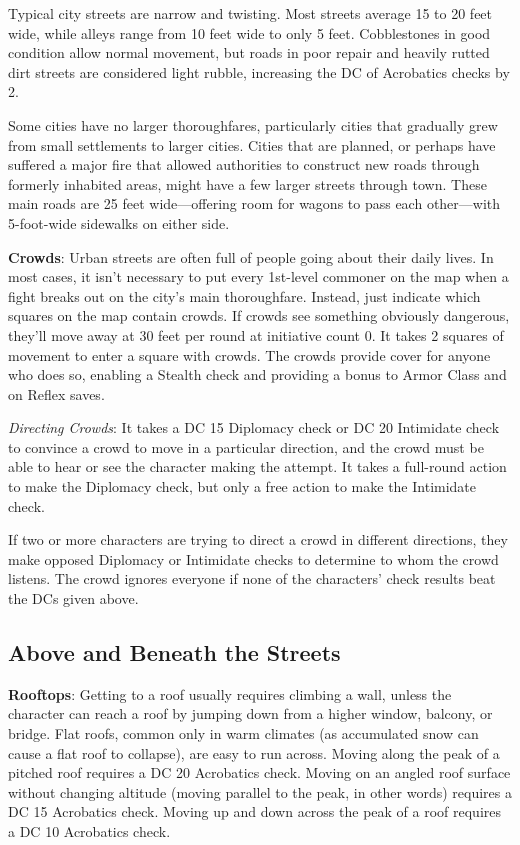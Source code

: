 				
Typical city streets are narrow and twisting. Most streets average 15 to 20 feet wide, while alleys range from 10 feet wide to only 5 feet. Cobblestones in good condition allow normal movement, but roads in poor repair and heavily rutted dirt streets are considered light rubble, increasing the DC of Acrobatics checks by 2.
				
Some cities have no larger thoroughfares, particularly cities that gradually grew from small settlements to larger cities. Cities that are planned, or perhaps have suffered a major fire that allowed authorities to construct new roads through formerly inhabited areas, might have a few larger streets through town. These main roads are 25 feet wide---offering room for wagons to pass each other---with 5-foot-wide sidewalks on either side.
				
\textbf{Crowds}: Urban streets are often full of people going about their daily lives. In most cases, it isn't necessary to put every 1st-level commoner on the map when a fight breaks out on the city's main thoroughfare. Instead, just indicate which squares on the map contain crowds. If crowds see something obviously dangerous, they'll move away at 30 feet per round at initiative count 0. It takes 2 squares of movement to enter a square with crowds. The crowds provide cover for anyone who does so, enabling a Stealth check and providing a bonus to Armor Class and on Reflex saves.
				
\textit{Directing Crowds}: It takes a DC 15 Diplomacy check or DC 20 Intimidate check to convince a crowd to move in a particular direction, and the crowd must be able to hear or see the character making the attempt. It takes a full-round action to make the Diplomacy check, but only a free action to make the Intimidate check.
				
If two or more characters are trying to direct a crowd in different directions, they make opposed Diplomacy or Intimidate checks to determine to whom the crowd listens. The crowd ignores everyone if none of the characters' check results beat the DCs given above.
				
\subsection{Above and Beneath the Streets}

				
\textbf{Rooftops}: Getting to a roof usually requires climbing a wall, unless the character can reach a roof by jumping down from a higher window, balcony, or bridge. Flat roofs, common only in warm climates (as accumulated snow can cause a flat roof to collapse), are easy to run across. Moving along the peak of a pitched roof requires a DC 20 Acrobatics check. Moving on an angled roof surface without changing altitude (moving parallel to the peak, in other words) requires a DC 15 Acrobatics check. Moving up and down across the peak of a roof requires a DC 10 Acrobatics check.
				
